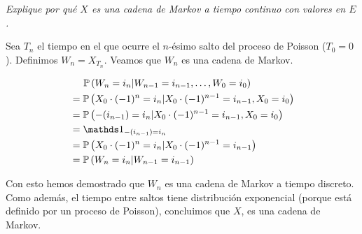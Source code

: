 \emph{
    Explique por qu\'e $X$ es una cadena de Markov a tiempo continuo con valores en $E$.\pn 
}

\afterstatement\pn

Sea $T_n$ el tiempo en el que ocurre el $n$-ésimo salto del proceso de Poisson
($T_0 = 0$). Definimos $W_{n} = X_{T_n}$. Veamos que $W_n$ es una cadena de Markov.

\begin{align}
    & \;\;\;\;\; \P\left(W_n = i_n | W_{n-1} = i_{n-1}, \dots, W_0 = i_0 \right)                \\
    & =\P\left(X_0 \cdot (-1)^n  = i_n | X_0 \cdot (-1)^{n-1}  = i_{n-1}, X_0 = i_{0} \right)   \\
    & =\P\left( -(i_{n-1})  = i_n | X_0 \cdot (-1)^{n-1}  = i_{n-1}, X_0 = i_{0} \right)        \\
    & =\indic_{-(i_{n-1})  = i_n}                                                               \\
    & =\P\left(X_0 \cdot (-1)^n  = i_n | X_0 \cdot (-1)^{n-1}  = i_{n-1}\right)                 \\
    & =\P\left(W_n  = i_n | W_{n-1}  = i_{n-1}\right)                                                 
\end{align}\pn

Con esto hemos demostrado que $W_n$ es una cadena de Markov a tiempo discreto. Como además,
el tiempo entre saltos tiene distribución exponencial (porque está definido por un proceso de Poisson),
concluimos que $X$, es una cadena de Markov.